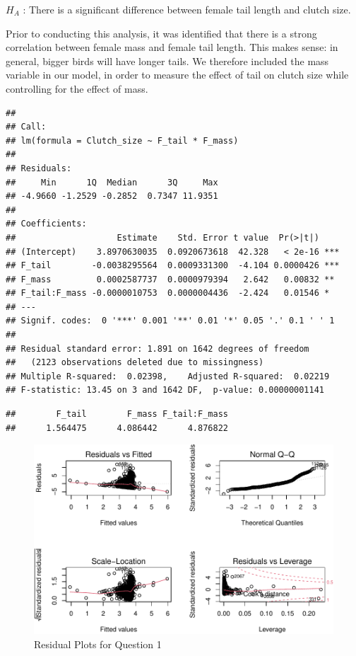 \documentclass[
  12pt,
]{article}
\begin{document}
\(H_A\) : There is a significant difference between female tail length
and clutch size.

Prior to conducting this analysis, it was identified that there is a
strong correlation between female mass and female tail length. This
makes sense: in general, bigger birds will have longer tails. We
therefore included the mass variable in our model, in order to measure
the effect of tail on clutch size while controlling for the effect of
mass.

\begin{verbatim}
## 
## Call:
## lm(formula = Clutch_size ~ F_tail * F_mass)
## 
## Residuals:
##     Min      1Q  Median      3Q     Max 
## -4.9660 -1.2529 -0.2852  0.7347 11.9351 
## 
## Coefficients:
##                    Estimate    Std. Error t value  Pr(>|t|)    
## (Intercept)    3.8970630035  0.0920673618  42.328   < 2e-16 ***
## F_tail        -0.0038295564  0.0009331300  -4.104 0.0000426 ***
## F_mass         0.0002587737  0.0000979394   2.642   0.00832 ** 
## F_tail:F_mass -0.0000010753  0.0000004436  -2.424   0.01546 *  
## ---
## Signif. codes:  0 '***' 0.001 '**' 0.01 '*' 0.05 '.' 0.1 ' ' 1
## 
## Residual standard error: 1.891 on 1642 degrees of freedom
##   (2123 observations deleted due to missingness)
## Multiple R-squared:  0.02398,    Adjusted R-squared:  0.02219 
## F-statistic: 13.45 on 3 and 1642 DF,  p-value: 0.00000001141
\end{verbatim}

\begin{verbatim}
##        F_tail        F_mass F_tail:F_mass 
##      1.564475      4.086442      4.876822
\end{verbatim}

\begin{figure}
\centering
\includegraphics{Project_Code_files/figure-latex/q-1_residuals-1.pdf}
\caption{Residual Plots for Question 1}
\end{figure}
\end{document}
